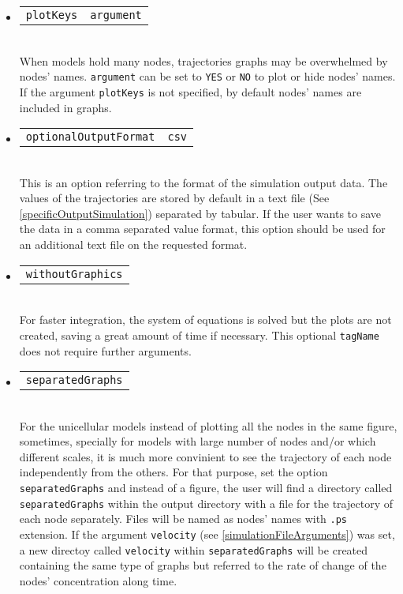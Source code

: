 \documentclass[a4paper, 11pt]{article}
\begin{document}
\begin{itemize}
\item \begin{tabular}{cc}\texttt{plotKeys}&\texttt{argument}\end{tabular}\\[1.5ex]
  When models hold many nodes, trajectories graphs may be overwhelmed by nodes' names. 
  \texttt{argument} can be set to \texttt{YES} or \texttt{NO} to plot or hide nodes' names.
  If the argument \texttt{plotKeys} is not specified, by default nodes' names are included in graphs.
\item \begin{tabular}{cc}\texttt{optionalOutputFormat}&\texttt{csv}\end{tabular}\\[1.5ex]
This is an option referring to the format of the simulation output data.
The values of the trajectories are stored by default in a text file (See \ref{specificOutputSimulation}) separated by tabular.
If the user wants to save the data in a comma separated value format, this option should be used for an additional text file on the requested format.
\item \begin{tabular}{c}\texttt{withoutGraphics}\end{tabular}\\[1.5ex]
For faster integration, the system of equations is solved but the plots are not created, saving a great amount of time if necessary.
This optional \texttt{tagName} does not require further arguments.
\item \begin{tabular}{c}\texttt{separatedGraphs}\end{tabular}\\[1.5ex]
  For the unicellular models instead of plotting all the nodes in the same figure, sometimes, specially for models with large number of nodes and/or which different scales, it is much more convinient to see the trajectory of each node independently from the others.
  For that purpose, set the option \texttt{separatedGraphs} and instead of a figure, the user will find a directory called \texttt{separatedGraphs} within the output directory with a file for the trajectory of each node separately.
  Files will be named as nodes' names with \texttt{.ps} extension.
  If the argument \texttt{velocity} (see \ref{simulationFileArguments}) was set, a new directoy called \texttt{velocity} within \texttt{separatedGraphs} will be created containing the same type of graphs but referred to the rate of change of the nodes' concentration along time.
\end{itemize}
\end{document}
